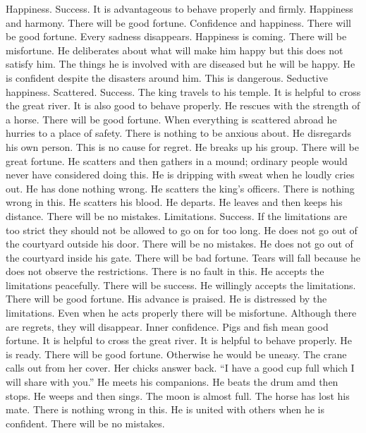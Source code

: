 	{Happiness. Success. It is advantageous to behave properly and firmly.}
	{Happiness and harmony. There will be good fortune.}
	{Confidence and happiness. There will be good fortune. Every sadness disappears.}
	{Happiness is coming. There will be misfortune.}
	{He deliberates about what will make him happy but this does not satisfy him. The things he is involved
		with are diseased but he will be happy.}
	{He is confident despite the disasters around him. This is dangerous.}
	{Seductive happiness.}
\or {}
	{Scattered. Success. The king travels to his temple. It is helpful to cross the great river. It is also
		good to behave properly.}
	{He rescues with the strength of a horse. There will be good fortune.}
	{When everything is scattered abroad he hurries to a place of safety. There is nothing to be
		anxious about.}
	{He disregards his own person. This is no cause for regret.}
	{He breaks up his group. There will be great fortune. He scatters and then gathers in a mound;
		ordinary people would never have considered doing this.}
	{He is dripping with sweat when he loudly cries out. He has done nothing wrong. He scatters the king's
		officers. There is nothing wrong in this.}
	{He scatters his blood. He departs. He leaves and then keeps his distance. There will be no mistakes.}
\or {}
	{Limitations. Success. If the limitations are too strict they should not be allowed to go on for too long.}
	{He does not go out of the courtyard outside his door. There will be no mistakes.}
	{He does not go out of the courtyard inside his gate. There will be bad fortune.}
	{Tears will fall because he does not observe the restrictions. There is no fault in this.}
	{He accepts the limitations peacefully. There will be success.}
	{He willingly accepts the limitations. There will be good fortune. His advance is praised.}
	{He is distressed by the limitations. Even when he acts properly there will be misfortune. Although
		there are regrets, they will disappear.}
\or {}
	{Inner confidence. Pigs and fish mean good fortune. It is helpful to cross the great river. It is
		helpful to behave properly.}
	{He is ready. There will be good fortune. Otherwise he would be uneasy.}
	{The crane calls out from her cover. Her chicks answer back. ``I have a good cup full which I will
		share with you.''}
	{He meets his companions. He beats the drum amd then stops. He weeps and then sings.}
	{The moon is almost full. The horse has lost his mate. There is nothing wrong in this.}
	{He is united with others when he is confident. There will be no mistakes.}

